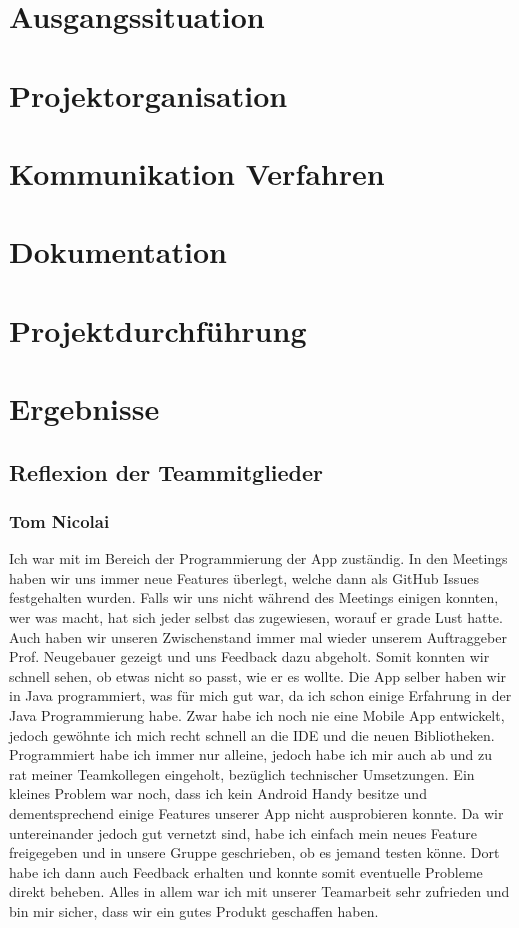 \documentclass{article}
\begin{document}
\section{Ausgangssituation}
\section{Projektorganisation}
\section{Kommunikation Verfahren}
\section{Dokumentation}
\section{Projektdurchführung}
\section{Ergebnisse}
\subsection{Reflexion der Teammitglieder}
\subsubsection{Tom Nicolai}
    Ich war mit im Bereich der Programmierung der App zuständig. In den Meetings haben wir uns immer neue Features überlegt, 
    welche dann als GitHub Issues festgehalten wurden. Falls wir uns nicht während des Meetings einigen konnten, wer was macht, 
    hat sich jeder selbst das zugewiesen, worauf er grade Lust hatte. Auch haben wir unseren Zwischenstand immer mal wieder unserem 
    Auftraggeber Prof. Neugebauer gezeigt und uns Feedback dazu abgeholt. Somit konnten wir schnell sehen, ob etwas nicht so passt, 
    wie er es wollte. Die App selber haben wir in Java programmiert, was für mich gut war, da ich schon einige Erfahrung 
    in der Java Programmierung habe. Zwar habe ich noch nie eine Mobile App entwickelt, jedoch gewöhnte ich mich recht schnell 
    an die IDE und die neuen Bibliotheken. Programmiert habe ich immer nur alleine, jedoch habe ich mir auch ab und zu rat meiner 
    Teamkollegen eingeholt, bezüglich technischer Umsetzungen. Ein kleines Problem war noch, dass ich kein Android Handy besitze 
    und dementsprechend einige Features unserer App nicht ausprobieren konnte. Da wir untereinander jedoch gut vernetzt sind, 
    habe ich einfach mein neues Feature freigegeben und in unsere Gruppe geschrieben, ob es jemand testen könne. 
    Dort habe ich dann auch Feedback erhalten und konnte somit eventuelle Probleme direkt beheben. Alles in allem 
    war ich mit unserer Teamarbeit sehr zufrieden und bin mir sicher, dass wir ein gutes Produkt geschaffen haben.
\end{document}

